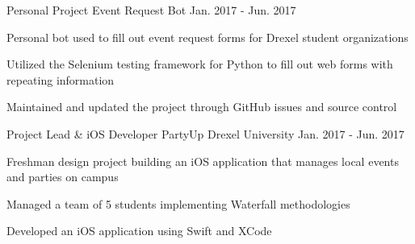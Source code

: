

\begin{cventries}

  \cventry
    {Personal Project} %
    {Event Request Bot} %
    {} %
    {Jan. 2017 - Jun. 2017} %
    {
      \begin{cvitems} %
        \item Personal bot used to fill out event request forms for Drexel student organizations
        \item Utilized the Selenium testing framework for Python to fill out web forms with repeating information
        \item Maintained and updated the project through GitHub issues and source control
      \end{cvitems}
    }

  \cventry
    {Project Lead \& iOS Developer} %
    {PartyUp} %
    {Drexel University} %
    {Jan. 2017 - Jun. 2017} %
    {
      \begin{cvitems} %
        \item Freshman design project building an iOS application that manages local events and parties on campus
        \item Managed a team of 5 students implementing Waterfall methodologies
        \item Developed an iOS application using Swift and XCode
      \end{cvitems}
    }

\end{cventries}